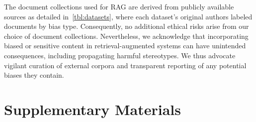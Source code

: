 \documentclass[11pt,a4paper]{article}
\begin{document}
The document collections used for \ac{RAG} are derived from publicly available sources as detailed in~\autoref{tbl:datasets}, where each dataset’s original authors labeled documents by bias type. Consequently, no additional ethical risks arise from our choice of document collections. Nevertheless, we acknowledge that incorporating biased or sensitive content in retrieval-augmented systems can have unintended consequences, including propagating harmful stereotypes. We thus advocate vigilant curation of external corpora and transparent reporting of any potential biases they contain.









%

\appendix
\section*{Supplementary Materials}
\end{document}
